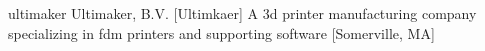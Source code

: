 \newglsXcompany%
{ultimaker}%
{Ultimaker, B.V.}%
[Ultimkaer]%
{A \gls{3d} printer manufacturing company specializing in \gls{fdm} printers and supporting software \cite{website:Ultimaker}}%
[Somerville, MA]%